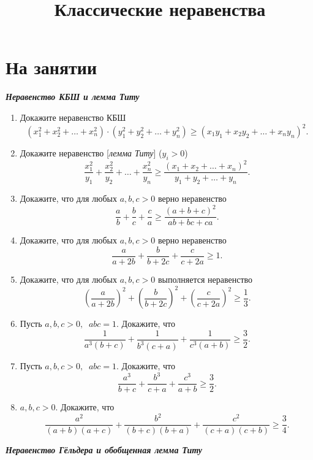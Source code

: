\documentclass[a4paper,12pt,leqno]{article}
\title{\textbf{Классические неравенства}}
\date{}
\theoremstyle{plain} %
\theoremstyle{definition} %
\theoremstyle{remark} %
\begin{document}
	\fontsize{14}{16pt}\selectfont
	\parskip=0mm
	\linespread{1}
	\maketitle
	
	
	\newcommand{\z}{\addtocounter{zadacha}{1}%
		\boxed{\arabic{zadacha}} }
	\section*{На занятии}
	\textbf{\textit{Неравенство КБШ и лемма Титу}}
	\begin{enumerate}
		\item[\z] Докажите неравенство  КБШ
		$$(x_1^2 + x_2^2 + \dots + x_n^2)\cdot (y_1^2+y_2^2+ \dots + y_n^2) \geqslant (x_1y_1 + x_2y_2 + \dots + x_ny_n)^2 .$$
		
		\item[\z] Докажите неравенство [\textit{лемма Титу}] ($y_i > 0$)
		$$\frac{x_1^2}{y_1} + \frac{x_2^2}{y_2} + \dots + \frac{x_n^2}{y_n} \geqslant \frac{(x_1+x_2+ \dots + x_n)^2}{y_1+y_2+ \dots + y_n}.$$
		\item[\z] Докажите, что для любых $a, b, c > 0$ верно неравенство
		$$\frac{a}{b} + \frac{b}{c} + \frac{c}{a} \geqslant \frac{(a+b+c)^2}{ab + bc+ca}.$$
		\item[\z] Докажите, что для любых $a, b, c > 0$ верно неравенство
		$$\frac{a}{a+2b} + \frac{b}{b+2c}+ \frac{c}{c+2a} \geqslant 1.$$
		\item[\z] Докажите, что для любых $a, b, c > 0$ выполняется неравенство
		$$\left( \frac{a}{a+2b} \right) ^ 2 + \left( \frac{b}{b+2c}\right) ^2 + \left( \frac{c}{c+2a}\right)^2 \geqslant \frac{1}{3}  .$$
		\item[\z] Пусть $a, b, c > 0, \;\; abc = 1$. Докажите, что 
		$$\frac{1}{a^3(b+c)} + \frac{1}{b^3(c+a)} + \frac{1}{c^3(a+b)} \geqslant \frac{3}{2}.$$  
		\item[\z] Пусть $a, b, c > 0, \;\; abc=1$. Докажите, что 
		$$\frac{a^3}{b+c} + \frac{b^3}{c+a} + \frac{c^3}{a+b} \geqslant \frac{3}{2}.$$
		\item[\z] $a, b, c > 0$. Докажите, что 
		$$\frac{a^2}{(a+b)(a+c)} + \frac{b^2}{(b+c)(b+a)} + \frac{c^2}{(c+a)(c+b)} \geqslant \frac{3}{4}.$$
	\end{enumerate}
	
	\textbf{\textit{Неравенство Гёльдера и обобщенная лемма Титу}}
	
\end{document}
